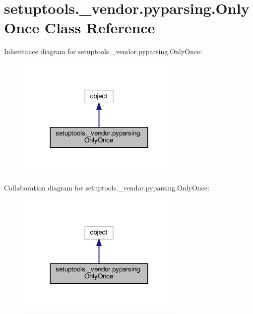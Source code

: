\hypertarget{classsetuptools_1_1__vendor_1_1pyparsing_1_1OnlyOnce}{}\section{setuptools.\+\_\+vendor.\+pyparsing.\+Only\+Once Class Reference}
\label{classsetuptools_1_1__vendor_1_1pyparsing_1_1OnlyOnce}


Inheritance diagram for setuptools.\+\_\+vendor.\+pyparsing.\+Only\+Once\+:
\nopagebreak
\begin{figure}[H]
\begin{center}
\leavevmode
\includegraphics[width=227pt]{classsetuptools_1_1__vendor_1_1pyparsing_1_1OnlyOnce__inherit__graph}
\end{center}
\end{figure}


Collaboration diagram for setuptools.\+\_\+vendor.\+pyparsing.\+Only\+Once\+:
\nopagebreak
\begin{figure}[H]
\begin{center}
\leavevmode
\includegraphics[width=227pt]{classsetuptools_1_1__vendor_1_1pyparsing_1_1OnlyOnce__coll__graph}
\end{center}
\end{figure}
